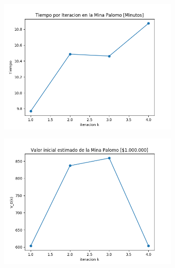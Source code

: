 \documentclass[12pt,letterpaper]{article}
\begin{document}
\begin{figure}[H]
  \begin{subfigure}[b]{0.4\textwidth}
     \includegraphics[width=\textwidth]{Graficos/sin_filtrar/libre/palomo25_inc_times.png}
     \caption{}
     \label{fig:ex1}
  \end{subfigure}
  \begin{subfigure}[b]{0.4\textwidth}
     \includegraphics[width=\textwidth]{Graficos/sin_filtrar/libre/palomo25_inc_v_k.png} 
     \caption{}
     \label{fig:ex2}
  \end{subfigure}
\end{figure}

\newpage
\end{document}
